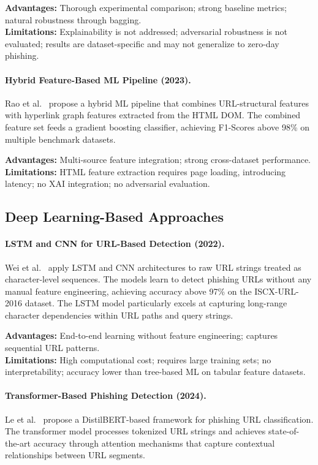 \textbf{Advantages:} Thorough experimental comparison; strong baseline metrics; natural robustness through bagging.\\
\textbf{Limitations:} Explainability is not addressed; adversarial robustness is not evaluated; results are dataset-specific and may not generalize to zero-day phishing.

\paragraph{Hybrid Feature-Based ML Pipeline (2023).}
Rao et al.~\cite{ref_ml4} propose a hybrid ML pipeline that combines URL-structural features with hyperlink graph features extracted from the HTML DOM. The combined feature set feeds a gradient boosting classifier, achieving F1-Scores above 98\% on multiple benchmark datasets.

\textbf{Advantages:} Multi-source feature integration; strong cross-dataset performance.\\
\textbf{Limitations:} HTML feature extraction requires page loading, introducing latency; no XAI integration; no adversarial evaluation.

\subsection{Deep Learning-Based Approaches}

\paragraph{LSTM and CNN for URL-Based Detection (2022).}
Wei et al.~\cite{ref_dl1} apply LSTM and CNN architectures to raw URL strings treated as character-level sequences. The models learn to detect phishing URLs without any manual feature engineering, achieving accuracy above 97\% on the ISCX-URL-2016 dataset. The LSTM model particularly excels at capturing long-range character dependencies within URL paths and query strings.

\textbf{Advantages:} End-to-end learning without feature engineering; captures sequential URL patterns.\\
\textbf{Limitations:} High computational cost; requires large training sets; no interpretability; accuracy lower than tree-based ML on tabular feature datasets.

\paragraph{Transformer-Based Phishing Detection (2024).}
Le et al.~\cite{transformer_phishing} propose a DistilBERT-based framework for phishing URL classification. The transformer model processes tokenized URL strings and achieves state-of-the-art accuracy through attention mechanisms that capture contextual relationships between URL segments.

